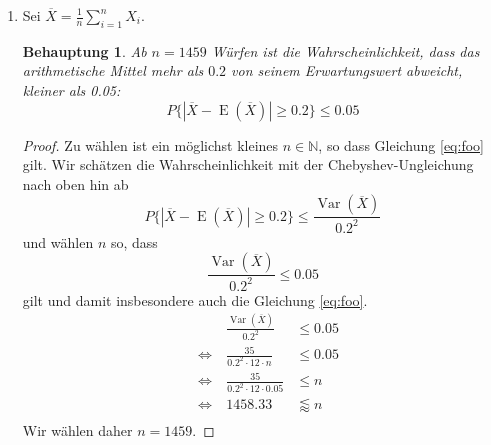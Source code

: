 \documentclass[a4paper]{scrartcl}
\newtheorem*{behaupt}{Behauptung}
\newcommand{\gdw}{\Leftrightarrow}
\newcommand{\e}{\operatorname{E}}
\newcommand{\var}{\operatorname{Var}}
\begin{document}
\begin{enumerate}[label=\bfseries\arabic*.]
\begin{enumerate}[label=(\alph*)]
            \item
                Sei $\overline{X} = \frac{1}{n} \sum_{i=1}^n X_i$.
                \begin{behaupt}
                    Ab $n = 1459$ Würfen ist die Wahrscheinlichkeit, dass das
                    arithmetische Mittel mehr als $\num{0,2}$ von seinem
                    Erwartungswert abweicht, kleiner als \num{0,05}:
                \begin{equation}
                    P\{|\overline{X} - \e(\overline{X})| \geq \num{0,2}\}
                    \leq \num{0,05}
                    \label{eq:foo}
                \end{equation}
                \end{behaupt}
                \begin{proof}
                Zu wählen ist ein möglichst kleines $n \in \mathbb{N}$, so dass
                Gleichung \eqref{eq:foo} gilt.
                Wir schätzen die Wahrscheinlichkeit mit der
                Chebyshev-Ungleichung nach oben hin ab
                \begin{equation*}
                    P\{|\overline{X} - \e(\overline{X})| \geq \num{0,2}\}
                    \leq \frac{\var(\overline{X})}{\num{0,2}^2}
                \end{equation*}
                und wählen $n$ so, dass
                \begin{equation*}
                    \frac{\var(\overline{X})}{\num{0,2}^2}
                    \leq \num{0,05}
                \end{equation*}
                gilt und damit insbesondere auch die Gleichung \eqref{eq:foo}.
                \begin{equation*}
                    \begin{alignedat}{2}
                        && \frac{\var(\overline{X})}{\num{0,2}^2}
                        &\leq \num{0,05} \\
                        &\gdw\ & \frac{35}{\num{0,2}^2 \cdot 12 \cdot n}
                        &\leq \num{0,05} \\
                        &\gdw\ &\frac{35}{\num{0,2}^2 \cdot 12 \cdot \num{0,05}}
                        &\leq n \\
                        &\gdw\ & \num{1458,33}
                        &\lessapprox n \\
                    \end{alignedat}
                \end{equation*}
                Wir wählen daher $n = 1459$.
                \end{proof}


\end{enumerate}
\end{enumerate}
\end{document}
